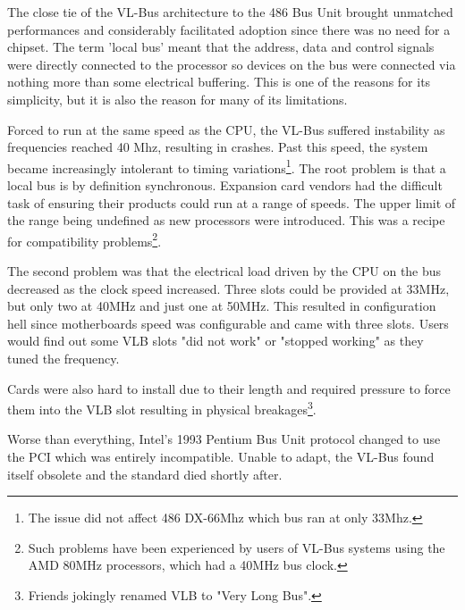 \par
The close tie of the VL-Bus architecture to the 486 Bus Unit brought unmatched performances and considerably facilitated adoption since there was no need for a chipset. The term 'local bus' meant that the address, data and control signals were directly connected to the processor so devices on the bus were connected via nothing more than some electrical buffering. This is one of the reasons for its simplicity, but it is also the reason for many of its limitations.\\
\par
Forced to run at the same speed as the CPU, the VL-Bus suffered instability as frequencies reached 40 Mhz, resulting in crashes. Past this speed, the system became increasingly intolerant to timing variations\footnote{The issue did not affect 486 DX-66Mhz which bus ran at only 33Mhz.}. The root problem is that a local bus is by definition synchronous. Expansion card vendors had the difficult task of ensuring their products could run at a range of speeds. The upper limit of the range being undefined as new processors were introduced. This was a recipe for compatibility problems\footnote{Such problems have been experienced by users of VL-Bus systems using the AMD 80MHz processors, which had a 40MHz bus clock.}.\\
\par
The second problem was that the electrical load driven by the CPU on the bus decreased as the clock speed increased. Three slots could be provided at 33MHz, but only two at 40MHz and just one at 50MHz. This resulted in configuration hell since motherboards speed was configurable and came with three slots. Users would find out some VLB slots "did not work" or "stopped working" as they tuned the frequency.\\
\par
Cards were also hard to install due to their length and required pressure to force them into the VLB slot resulting in physical breakages\footnote{Friends jokingly renamed VLB to "Very Long Bus".}.\\
\par
  Worse than everything, Intel's 1993 Pentium Bus Unit protocol changed to use the PCI which was entirely incompatible. Unable to adapt, the VL-Bus found itself obsolete and the standard died shortly after.\\
\par

